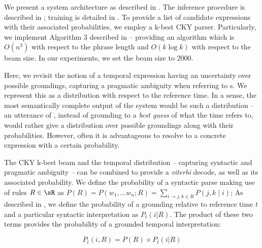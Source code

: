 We present a system architecture as described in .
The inference procedure is described in ;
	training is detailed in .
To provide a list of
	candidate expressions with their associated probabilities, we
	employ a k-best CKY parser.
Particularly, we implement Algorithm 3 described in 
	 -- providing an algorithm which is
	$O(n^3)$ with respect to the phrase length and $O(k\log k)$ with respect
	to the beam size.
In our experiments, we set the beam size to 2000.

Here, we revisit the notion of a temporal expression having an uncertainty
	over possible groundings, capturing a pragmatic ambiguity when
	referring to s.
We represent this as a distribution with respect to the reference time.
In a sense, the most semantically complete output of the system would be
	such a distribution -- 
	an utterance of , instead of grounding to a 
	\textit{best guess} of what the time refers to, would rather give a 
	distribution over possible groundings along with their probabilities.
However, often it is advantageous to resolve to a concrete expression with a
	certain probability.

The CKY k-best beam and the temporal distribution 
	-- capturing syntactic and pragmatic ambiguity --
	can be combined to provide a \textit{viterbi} decode, as well as
	its associated probability.
We define the probability of a syntactic parse making use of rules $R \in \sR$ 
	as $P(R) = P(w_1,\dots w_n; R) = \sum_{i \rightarrow j,k \in R}P(j,k \mid i)$;
	As described in , we define the probability of a 
	grounding relative to reference time $t$ and a particular
	syntactic interpretation as $P_t(i | R)$.
The product of these two terms provides the probability of a grounded temporal
	interpretation:

\begin{equation}
	P_t(i, R) = 
		P( R ) \times P_t(i | R)
\label{eqn:prob}
\end{equation}

